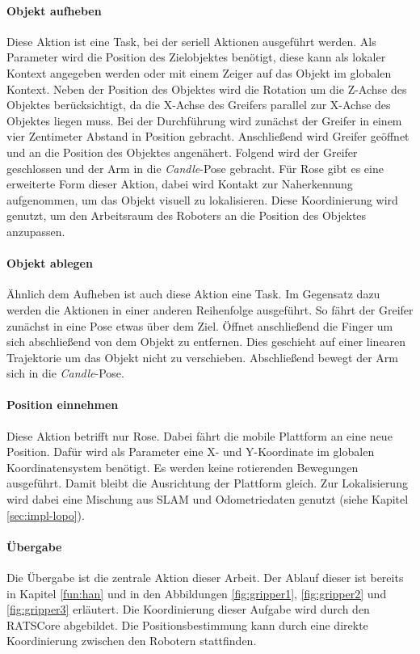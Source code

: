 \paragraph{Objekt aufheben} Diese Aktion ist eine Task, bei der seriell Aktionen ausgeführt werden. Als Parameter wird die Position des Zielobjektes benötigt, diese kann als lokaler Kontext angegeben werden oder mit einem Zeiger auf das Objekt im globalen Kontext. Neben der Position des Objektes wird die Rotation um die Z-Achse des Objektes berücksichtigt, da die X-Achse des Greifers parallel zur X-Achse des Objektes liegen muss. Bei der Durchführung wird zunächst der Greifer in einem vier Zentimeter Abstand in Position gebracht. Anschließend wird Greifer geöffnet und an die Position des Objektes angenähert. Folgend wird der Greifer geschlossen und der Arm in die \textit{Candle}-Pose gebracht. Für Rose gibt es eine erweiterte Form dieser Aktion, dabei wird Kontakt zur Naherkennung aufgenommen, um das Objekt visuell zu lokalisieren. Diese Koordinierung wird genutzt, um den Arbeitsraum des Roboters an die Position des Objektes anzupassen.

\paragraph{Objekt ablegen} Ähnlich dem Aufheben ist auch diese Aktion eine Task. Im Gegensatz dazu werden die Aktionen in einer anderen Reihenfolge ausgeführt. So fährt der Greifer zunächst in eine Pose etwas über dem Ziel. Öffnet anschließend die Finger um sich abschließend von dem Objekt zu entfernen. Dies geschieht auf einer linearen Trajektorie um das Objekt nicht zu verschieben. Abschließend bewegt der Arm sich in die \textit{Candle}-Pose.

\paragraph{Position einnehmen}
Diese Aktion betrifft nur Rose. Dabei fährt die mobile Plattform an eine neue Position. Dafür wird als Parameter eine X- und Y-Koordinate im globalen Koordinatensystem benötigt. Es werden keine rotierenden Bewegungen ausgeführt. Damit bleibt die Ausrichtung der Plattform gleich. Zur Lokalisierung wird dabei eine Mischung aus SLAM und Odometriedaten genutzt (siehe Kapitel \ref{sec:impl-lopo}).

\paragraph{Übergabe} Die Übergabe ist die zentrale Aktion dieser Arbeit. Der Ablauf dieser ist bereits in Kapitel \ref{fun:han} und in den Abbildungen \ref{fig:gripper1}, \ref{fig:gripper2} und \ref{fig:gripper3} erläutert. Die Koordinierung dieser Aufgabe wird durch den RATSCore abgebildet. Die Positionsbestimmung kann durch eine direkte Koordinierung zwischen den Robotern stattfinden.

